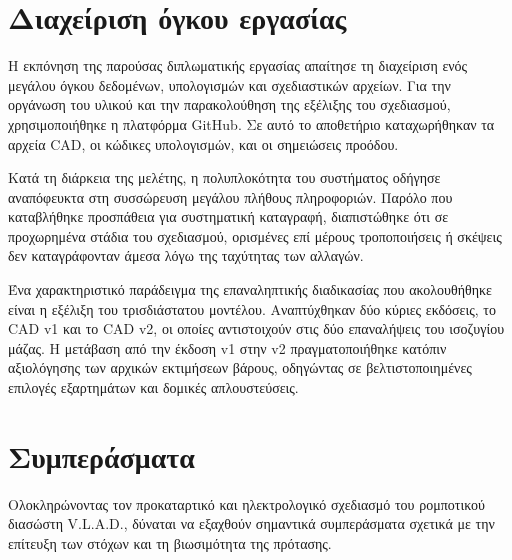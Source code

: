 \section{Διαχείριση όγκου εργασίας}

Η εκπόνηση της παρούσας διπλωματικής εργασίας απαίτησε τη διαχείριση ενός μεγάλου όγκου δεδομένων, υπολογισμών και σχεδιαστικών αρχείων. Για την οργάνωση του υλικού και την παρακολούθηση της εξέλιξης του σχεδιασμού, χρησιμοποιήθηκε η πλατφόρμα GitHub. Σε αυτό το αποθετήριο καταχωρήθηκαν τα αρχεία CAD, οι κώδικες υπολογισμών, και οι σημειώσεις προόδου.

\par Κατά τη διάρκεια της μελέτης, η πολυπλοκότητα του συστήματος οδήγησε αναπόφευκτα στη συσσώρευση μεγάλου πλήθους πληροφοριών. Παρόλο που καταβλήθηκε προσπάθεια για συστηματική καταγραφή, διαπιστώθηκε ότι σε προχωρημένα στάδια του σχεδιασμού, ορισμένες επί μέρους τροποποιήσεις ή σκέψεις δεν καταγράφονταν άμεσα λόγω της ταχύτητας των αλλαγών.

\par Ένα χαρακτηριστικό παράδειγμα της επαναληπτικής διαδικασίας που ακολουθήθηκε είναι η εξέλιξη του τρισδιάστατου μοντέλου. Αναπτύχθηκαν δύο κύριες εκδόσεις, το CAD v1 και το CAD v2, οι οποίες αντιστοιχούν στις δύο επαναλήψεις του ισοζυγίου μάζας. Η μετάβαση από την έκδοση v1 στην v2 πραγματοποιήθηκε κατόπιν αξιολόγησης των αρχικών εκτιμήσεων βάρους, οδηγώντας σε βελτιστοποιημένες επιλογές εξαρτημάτων και δομικές απλουστεύσεις.

\section{Συμπεράσματα}

Ολοκληρώνοντας τον προκαταρτικό και ηλεκτρολογικό σχεδιασμό του ρομποτικού διασώστη V.L.A.D., δύναται να εξαχθούν σημαντικά συμπεράσματα σχετικά με την επίτευξη των στόχων και τη βιωσιμότητα της πρότασης.

